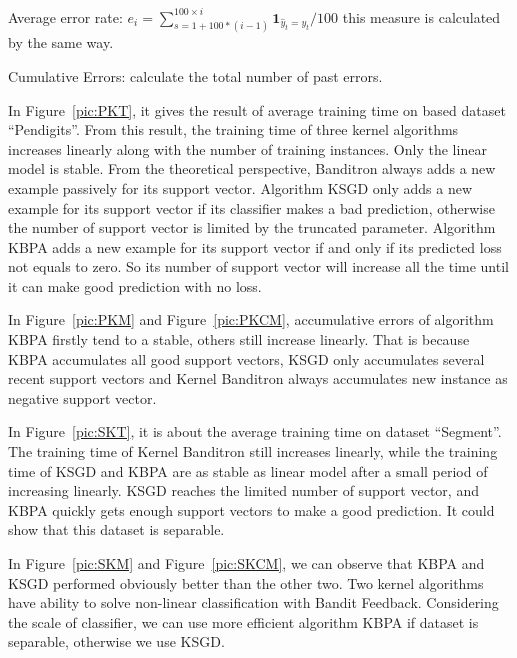 \documentclass[twocolumn]{article}
\begin{document}
Average error rate: $e_i = \sum_{s=1+100*(i-1)}^{100\times i}\mathbf{1}_{\hat{y}_t = y_t}/100$ this measure is calculated by the same way.

Cumulative Errors: calculate the total number of past errors.

In Figure~\ref{pic:PKT}, it gives the result of average training time on based dataset ``Pendigits''.  From this result, the training time of three kernel algorithms increases linearly along with the number of training instances. Only the linear model is stable. From the theoretical perspective, Banditron always adds a new example passively for its support vector. Algorithm KSGD only adds a new example for its support vector if its classifier makes a bad prediction, otherwise the number of support vector is limited by the truncated parameter. Algorithm KBPA adds a new example for its support vector if and only if its predicted loss not equals to zero. So its number of support vector will increase all the time until it can make good prediction with no loss.

In Figure~\ref{pic:PKM} and Figure~\ref{pic:PKCM}, accumulative errors of algorithm KBPA firstly tend to a stable, others still increase linearly. That is because KBPA accumulates all good support vectors, KSGD only accumulates several recent support vectors and Kernel Banditron always accumulates new instance as negative support vector.

In Figure~\ref{pic:SKT}, it is about the average training time on dataset ``Segment''.  The training time of Kernel Banditron still increases linearly, while the training time of KSGD and KBPA are as stable as linear model after a small period of increasing linearly. KSGD reaches the limited number of support vector, and KBPA quickly gets enough support vectors to make a good prediction. It could show that this dataset is separable. 

In Figure~\ref{pic:SKM} and Figure~\ref{pic:SKCM}, we can observe that KBPA and KSGD performed obviously better than the other two.  Two kernel algorithms have ability to solve non-linear classification with Bandit Feedback. Considering the scale of classifier, we can use more efficient algorithm KBPA if dataset is separable, otherwise we use KSGD.
\end{document}
